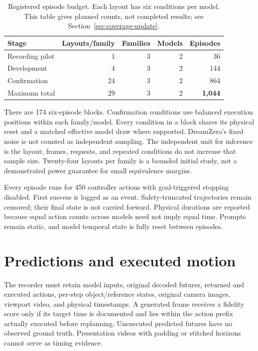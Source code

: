 \documentclass[11pt]{article}
\begin{document}
\begin{table}[ht]
\centering
\caption{Registered episode budget. Each layout has six conditions per model. This table gives planned counts, not completed results; see Section~\ref{sec:coverage-update}.}
\label{tab:matrix}
\begin{tabular}{@{}lrrrr@{}}
\toprule
Stage & Layouts/family & Families & Models & Episodes \\
\midrule
Recording pilot & 1 & 3 & 2 & 36 \\
Development & 4 & 3 & 2 & 144 \\
Confirmation & 24 & 3 & 2 & 864 \\
\midrule
Maximum total & 29 & 3 & 2 & \textbf{1,044} \\
\bottomrule
\end{tabular}
\end{table}

There are 174 six-episode blocks. Confirmation conditions use balanced execution positions within each family/model. Every condition in a block shares its physical reset and a matched effective model draw where supported. DreamZero's fixed noise is not counted as independent sampling. The independent unit for inference is the layout; frames, requests, and repeated conditions do not increase that sample size. Twenty-four layouts per family is a bounded initial study, not a demonstrated power guarantee for small equivalence margins.

Every episode runs for 450 controller actions with goal-triggered stopping disabled. First success is logged as an event. Safety-truncated trajectories remain censored; their final state is not carried forward. Physical durations are reported because equal action counts across models need not imply equal time. Prompts remain static, and model temporal state is fully reset between episodes.

\section{Predictions and executed motion}
The recorder must retain model inputs, original decoded futures, returned and executed actions, per-step object/reference states, original camera images, viewport video, and physical timestamps. A generated frame receives a fidelity score only if its target time is documented and lies within the action prefix actually executed before replanning. Unexecuted predicted futures have no observed ground truth. Presentation videos with padding or stitched horizons cannot serve as timing evidence.
\end{document}
